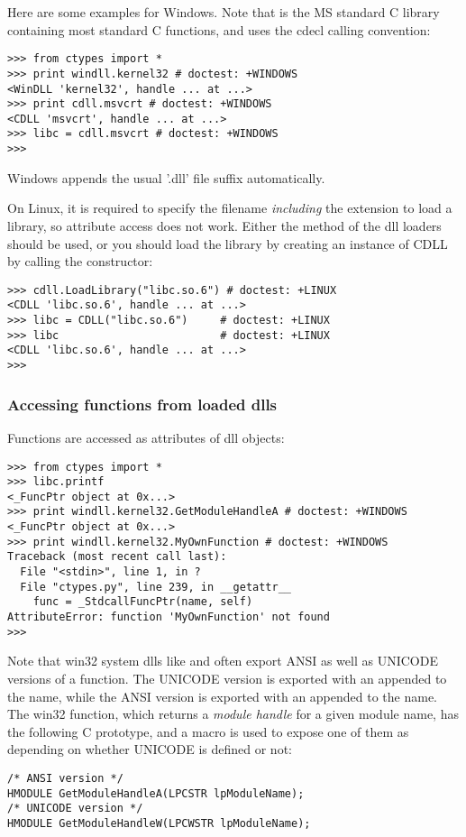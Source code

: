 Here are some examples for Windows. Note that  is the MS
standard C library containing most standard C functions, and uses the
cdecl calling convention:
\begin{verbatim}
>>> from ctypes import *
>>> print windll.kernel32 # doctest: +WINDOWS
<WinDLL 'kernel32', handle ... at ...>
>>> print cdll.msvcrt # doctest: +WINDOWS
<CDLL 'msvcrt', handle ... at ...>
>>> libc = cdll.msvcrt # doctest: +WINDOWS
>>>
\end{verbatim}

Windows appends the usual '.dll' file suffix automatically.

On Linux, it is required to specify the filename \emph{including} the
extension to load a library, so attribute access does not work.
Either the  method of the dll loaders should be used,
or you should load the library by creating an instance of CDLL by
calling the constructor:
\begin{verbatim}
>>> cdll.LoadLibrary("libc.so.6") # doctest: +LINUX
<CDLL 'libc.so.6', handle ... at ...>
>>> libc = CDLL("libc.so.6")     # doctest: +LINUX
>>> libc                         # doctest: +LINUX
<CDLL 'libc.so.6', handle ... at ...>
>>>
\end{verbatim}


\subsubsection{Accessing functions from loaded dlls\label{ctypes-accessing-functions-from-loaded-dlls}}

Functions are accessed as attributes of dll objects:
\begin{verbatim}
>>> from ctypes import *
>>> libc.printf
<_FuncPtr object at 0x...>
>>> print windll.kernel32.GetModuleHandleA # doctest: +WINDOWS
<_FuncPtr object at 0x...>
>>> print windll.kernel32.MyOwnFunction # doctest: +WINDOWS
Traceback (most recent call last):
  File "<stdin>", line 1, in ?
  File "ctypes.py", line 239, in __getattr__
    func = _StdcallFuncPtr(name, self)
AttributeError: function 'MyOwnFunction' not found
>>>
\end{verbatim}

Note that win32 system dlls like  and  often
export ANSI as well as UNICODE versions of a function. The UNICODE
version is exported with an  appended to the name, while the ANSI
version is exported with an  appended to the name. The win32
 function, which returns a \emph{module handle} for a
given module name, has the following C prototype, and a macro is used
to expose one of them as  depending on whether
UNICODE is defined or not:
\begin{verbatim}
/* ANSI version */
HMODULE GetModuleHandleA(LPCSTR lpModuleName);
/* UNICODE version */
HMODULE GetModuleHandleW(LPCWSTR lpModuleName);
\end{verbatim}

